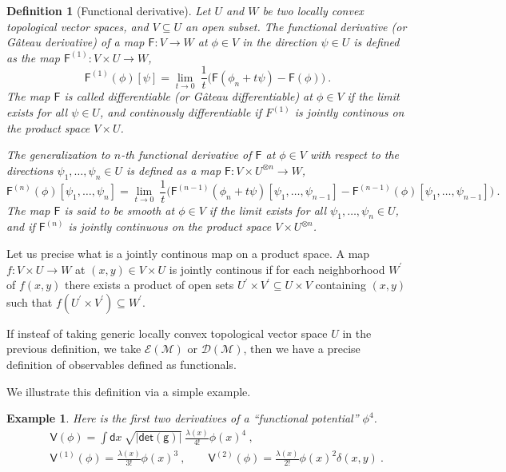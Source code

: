 \documentclass[10pt]{book}
\newcommand{\abs}[1]{\left|#1\right|}
\renewcommand{\det}{\mathsf{det}}
\newcommand{\Dcal}{\mathcal{D}}
\newcommand{\Ecal}{\mathcal{E}}
\newcommand{\Mcal}{\mathcal{M}}
\newcommand{\Fsf}{\mathsf{F}}
\newcommand{\Vsf}{\mathsf{V}}
\newcommand{\dsf}{\mathsf{d}}
\newcommand{\gsf}{\mathsf{g}}
\theoremstyle{break}
\newtheorem{example}{Example}
\newtheorem{definition}{Definition}
\begin{document}
\begin{definition}[Functional derivative]
Let $U$ and $W$ be two locally convex topological vector spaces, and $V \subseteq U$ an open subset. The functional derivative (or Gâteau derivative) of a map $\Fsf:  V \to W$ at $\phi \in V$ in the direction $\psi \in U$ is defined as the map $\Fsf^{(1)} : V \times U \to W$,
%
\begin{equation*}
\Fsf^{(1)}(\phi)[\psi] = \lim_{t \to 0} \ \frac{1}{t} \bigg( \Fsf(\phi_n + t \psi) - \Fsf(\phi) \bigg) \ .
\end{equation*}
% 
The map $\Fsf$ is called differentiable (or Gâteau differentiable) at $\phi \in V$ if the limit exists for all $\psi \in U$, and continously differentiable if $F^{(1)}$ is jointly continous on the product space $V \times U$.\par%
%
%
The generalization to $n$-th functional derivative of $\Fsf$ at $\phi \in V$ with respect to the directions $\psi_1, \dots, \psi_n \in U$ is defined as a map $\Fsf : V \times U^{\otimes n} \to W$,
%
\begin{equation*}%
\Fsf^{(n)}(\phi)[\psi_1,\dots ,\psi_n] = \lim_{t \to 0} \ \frac{1}{t} \bigg( \Fsf^{(n-1)}(\phi_n + t \psi)[\psi_1,\dots ,\psi_{n-1}] - \Fsf^{(n-1)}(\phi)[\psi_1,\dots ,\psi_{n-1}] \bigg) \ .
\end{equation*}
%
The map $\Fsf$ is said to be smooth at $\phi \in V$ if the limit exists for all $\psi_1, \dots, \psi_n \in U$, and if $\Fsf^{(n)}$ is jointly continuous on the product space $V \times U^{\otimes n}$.
\end{definition}


Let us precise what is a jointly continous map on a product space. A map $f : V \times U \to W$ at $(x,y) \in V \times U$ is jointly continous if for each neighborhood $W^\prime$ of $f(x,y)$ there exists a product of open sets $U^\prime \times V^\prime \subseteq U \times V$ containing $(x,y)$ such that $f(U^\prime \times V^\prime) \subseteq W^\prime$.


\bigskip


If insteaf of taking generic locally convex topological vector space $U$ in the previous definition, we take $\Ecal(\Mcal)$ or $\Dcal(\Mcal)$, then we have a precise definition of observables defined as functionals.


\bigskip


We illustrate this definition via a simple example.%
%
\begin{example}
%
Here is the first two derivatives of a ``functional potential'' $\phi^4$. 
%
\begin{eqnarray*}
&& \Vsf(\phi) = \int \dsf x \ \sqrt{\abs{\det(\gsf)}} \ \frac{\lambda(x)}{4!} \phi(x)^4 \ ,\\
%
&& \Vsf^{(1)}(\phi) = \frac{\lambda(x)}{3!} \phi(x)^3 \ , \qquad
%
\Vsf^{(2)}(\phi) = \frac{\lambda(x)}{2!} \phi(x)^2 \delta(x,y) \ .
\end{eqnarray*}
%
\end{example}
\end{document}
